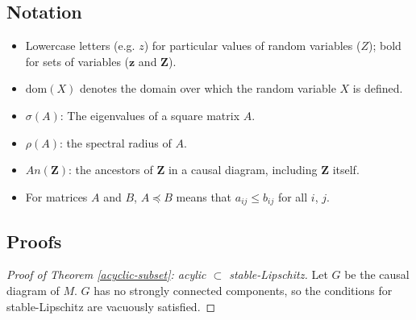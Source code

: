 \documentclass[letterpaper,10pt]{article}
\newtheorem{theorem}{Theorem}
\begin{document}
\subsection{Notation}
\begin{itemize}
  \item Lowercase letters (e.g. $z$) for particular values of random variables ($Z$); bold for sets of variables ($\mathbf{z}$ and $\mathbf{Z}$).
  \item $\text{dom}(X)$ denotes the domain over which the random variable $X$ is defined.
  \item $\sigma(A)$: The eigenvalues of a square matrix $A$.
  \item $\rho(A)$: the spectral radius of $A$.
  \item $An(\mathbf{Z})$: the ancestors of $\mathbf{Z}$ in a causal diagram, including $\mathbf{Z}$ itself.
  \item For matrices $A$ and $B$, $A \preceq B$ means that $a_{ij}\leq b_{ij}$ for all $i$, $j$.
\end{itemize}

\subsection{Proofs}


\begin{proof}[Proof of Theorem \ref{acyclic-subset}: acylic $\subset$ stable-Lipschitz]
Let $G$ be the causal diagram of $M$. $G$ has no strongly connected components, so the conditions for stable-Lipschitz are vacuously satisfied.
\end{proof}

\end{document}
